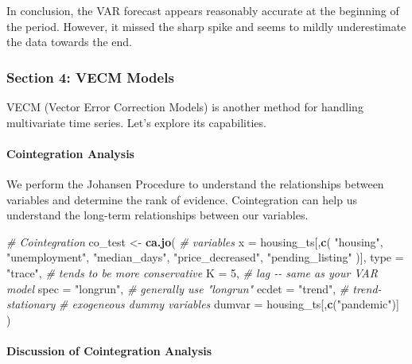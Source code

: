 \documentclass[
]{article}
\newenvironment{Shaded}{\begin{snugshade}}{\end{snugshade}}
\newcommand{\AttributeTok}[1]{\textcolor[rgb]{0.13,0.29,0.53}{#1}}
\newcommand{\CommentTok}[1]{\textcolor[rgb]{0.56,0.35,0.01}{\textit{#1}}}
\newcommand{\DecValTok}[1]{\textcolor[rgb]{0.00,0.00,0.81}{#1}}
\newcommand{\FunctionTok}[1]{\textcolor[rgb]{0.13,0.29,0.53}{\textbf{#1}}}
\newcommand{\NormalTok}[1]{#1}
\newcommand{\OtherTok}[1]{\textcolor[rgb]{0.56,0.35,0.01}{#1}}
\newcommand{\StringTok}[1]{\textcolor[rgb]{0.31,0.60,0.02}{#1}}
\begin{document}
In conclusion, the VAR forecast appears reasonably accurate at the
beginning of the period. However, it missed the sharp spike and seems to
mildly underestimate the data towards the end.

\hypertarget{section-4-vecm-models}{%
\subsubsection{Section 4: VECM Models}\label{section-4-vecm-models}}

VECM (Vector Error Correction Models) is another method for handling
multivariate time series. Let's explore its capabilities.

\hypertarget{cointegration-analysis}{%
\paragraph{Cointegration Analysis}\label{cointegration-analysis}}

We perform the Johansen Procedure to understand the relationships
between variables and determine the rank of evidence. Cointegration can
help us understand the long-term relationships between our variables.

\begin{Shaded}
\begin{Highlighting}[]
\CommentTok{\# Cointegration}
\NormalTok{co\_test }\OtherTok{\textless{}{-}} \FunctionTok{ca.jo}\NormalTok{(}
  \CommentTok{\# variables}
  \AttributeTok{x =}\NormalTok{ housing\_ts[,}\FunctionTok{c}\NormalTok{(}
    \StringTok{"housing"}\NormalTok{, }\StringTok{"unemployment"}\NormalTok{, }\StringTok{"median\_days"}\NormalTok{,}
    \StringTok{"price\_decreased"}\NormalTok{, }\StringTok{"pending\_listing"}
\NormalTok{  )],  }
  \AttributeTok{type =} \StringTok{"trace"}\NormalTok{, }\CommentTok{\# tends to be more conservative}
  \AttributeTok{K =} \DecValTok{5}\NormalTok{, }\CommentTok{\# lag {-}{-} same as your VAR model}
  \AttributeTok{spec =} \StringTok{"longrun"}\NormalTok{, }\CommentTok{\# generally use "longrun"}
  \AttributeTok{ecdet =} \StringTok{"trend"}\NormalTok{, }\CommentTok{\# trend{-}stationary}
  \CommentTok{\# exogeneous dummy variables}
  \AttributeTok{dumvar =}\NormalTok{ housing\_ts[,}\FunctionTok{c}\NormalTok{(}\StringTok{"pandemic"}\NormalTok{)]}
\NormalTok{)}
\end{Highlighting}
\end{Shaded}

\hypertarget{discussion-of-cointegration-analysis}{%
\paragraph{Discussion of Cointegration
Analysis}\label{discussion-of-cointegration-analysis}}
\end{document}
